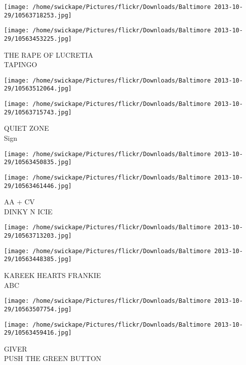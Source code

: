 \documentclass[10pt,letterpaper]{article}
\begin{document}
\texttt{[image: /home/swickape/Pictures/flickr/Downloads/Baltimore 2013-10-29/10563718253.jpg]}

\vspace{0.25in}
\texttt{[image: /home/swickape/Pictures/flickr/Downloads/Baltimore 2013-10-29/10563453225.jpg]}

THE RAPE OF LUCRETIA\\
TAPINGO\\
\pagebreak

\texttt{[image: /home/swickape/Pictures/flickr/Downloads/Baltimore 2013-10-29/10563512064.jpg]}

\vspace{0.25in}
\texttt{[image: /home/swickape/Pictures/flickr/Downloads/Baltimore 2013-10-29/10563715743.jpg]}

QUIET ZONE\\
Sign\\
\pagebreak

\texttt{[image: /home/swickape/Pictures/flickr/Downloads/Baltimore 2013-10-29/10563450835.jpg]}

\vspace{0.25in}
\texttt{[image: /home/swickape/Pictures/flickr/Downloads/Baltimore 2013-10-29/10563461446.jpg]}

AA + CV\\
DINKY N ICIE\\
\pagebreak

\texttt{[image: /home/swickape/Pictures/flickr/Downloads/Baltimore 2013-10-29/10563713203.jpg]}

\vspace{0.25in}
\texttt{[image: /home/swickape/Pictures/flickr/Downloads/Baltimore 2013-10-29/10563448385.jpg]}

KAREEK HEARTS FRANKIE\\
ABC\\
\pagebreak

\texttt{[image: /home/swickape/Pictures/flickr/Downloads/Baltimore 2013-10-29/10563507754.jpg]}

\vspace{0.25in}
\texttt{[image: /home/swickape/Pictures/flickr/Downloads/Baltimore 2013-10-29/10563459416.jpg]}

GIVER\\
PUSH THE GREEN BUTTON\\
\pagebreak
\end{document}
